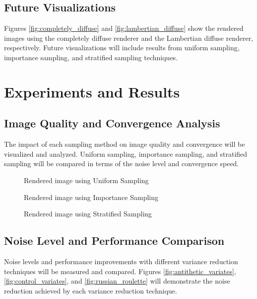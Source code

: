 \documentclass[12pt]{article}
\begin{document}
\subsection{Future Visualizations}
Figures \ref{fig:completely_diffuse} and \ref{fig:lambertian_diffuse} show the rendered images using the completely diffuse renderer and the Lambertian diffuse renderer, respectively. Future visualizations will include results from uniform sampling, importance sampling, and stratified sampling techniques.

\section{Experiments and Results}
\label{sec:experiments}
\subsection{Image Quality and Convergence Analysis}
The impact of each sampling method on image quality and convergence will be visualized and analyzed. Uniform sampling, importance sampling, and stratified sampling will be compared in terms of the noise level and convergence speed.

\begin{figure}[h]
    \centering
    \caption{Rendered image using Uniform Sampling}
    \label{fig:uniform_sampling}
\end{figure}

\begin{figure}[h]
    \centering
    \caption{Rendered image using Importance Sampling}
    \label{fig:importance_sampling}
\end{figure}

\begin{figure}[h]
    \centering
    \caption{Rendered image using Stratified Sampling}
    \label{fig:stratified_sampling}
\end{figure}

\subsection{Noise Level and Performance Comparison}
Noise levels and performance improvements with different variance reduction techniques will be measured and compared. Figures \ref{fig:antithetic_variates}, \ref{fig:control_variates}, and \ref{fig:russian_roulette} will demonstrate the noise reduction achieved by each variance reduction technique.
\end{document}
